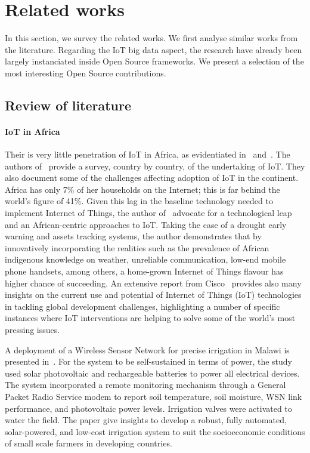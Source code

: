 

\section{Related works}

In this section, we survey the related works.
We first analyse similar works from the literature.
Regarding the IoT big data aspect, the research have already been largely instanciated inside Open Source frameworks.
We present a selection of the most interesting Open Source contributions.

\subsection{Review of literature}

\paragraph{IoT in Africa}
Their is very little penetration of IoT in Africa, as evidentiated in~\cite{Onyalo2015} and~\cite{Masinde2014}.
The authors of~\cite{Onyalo2015} provide a survey, country by country, of the undertaking of IoT.
They also document some of the challenges affecting adoption of IoT in the continent.
Africa has only 7\% of her households on the Internet; this is far behind the world’s figure of 41\%.
Given this lag in the baseline technology needed to implement Internet of Things, the author of~\cite{Masinde2014} advocate for a technological leap and an African-centric approaches to IoT.
Taking the case of a drought early warning and assets tracking systems, the author demonstrates that by innovatively incorporating the realities such as the prevalence of African indigenous knowledge on weather, unreliable communication, low-end mobile phone handsets, among others, a home-grown Internet of Things flavour has higher chance of succeeding.
An extensive report from Cisco~\cite{ITU2015} provides also many insights on the current use and potential of Internet of Things (IoT) technologies in tackling global development challenges, highlighting a number of specific instances where IoT interventions are helping to solve some of the world’s most pressing issues.


A deployment of a Wireless Sensor Network for precise irrigation in Malawi is presented in~\cite{Mafuta2013}.
For the system to be self-sustained in terms of power, the study used solar photovoltaic and rechargeable batteries to power all electrical devices.
The system incorporated a remote monitoring mechanism through a General Packet Radio Service modem to report soil temperature, soil moisture, WSN
link performance, and photovoltaic power levels. 
Irrigation valves were activated to water the field.
The paper give insights to develop a robust, fully automated, solar-powered, and low-cost irrigation system to suit the socioeconomic conditions of small scale farmers in developing countries.


